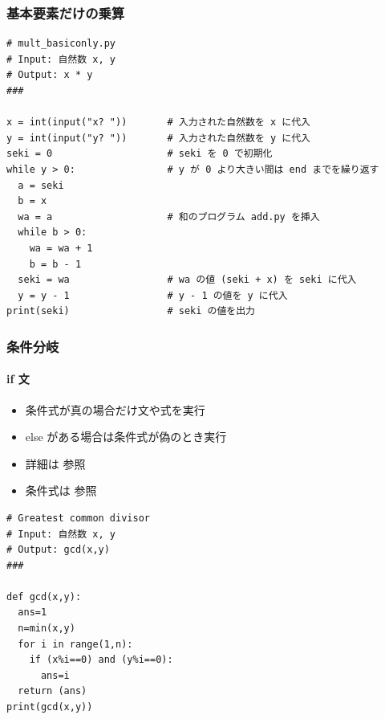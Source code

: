 \begin{frame}[fragile,label=mult,shrink]
\frametitle{基本要素だけの乗算}
  \begin{lstlisting}[caption={mult\_basiconly.py},label=lst:mult]
# mult_basiconly.py
# Input: 自然数 x, y
# Output: x * y
###

x = int(input("x? "))       # 入力された自然数を x に代入
y = int(input("y? "))       # 入力された自然数を y に代入
seki = 0                    # seki を 0 で初期化
while y > 0:                # y が 0 より大きい間は end までを繰り返す
  a = seki
  b = x
  wa = a                    # 和のプログラム add.py を挿入
  while b > 0:
    wa = wa + 1
    b = b - 1
  seki = wa                 # wa の値 (seki + x) を seki に代入
  y = y - 1                 # y - 1 の値を y に代入
print(seki)                 # seki の値を出力
  \end{lstlisting}
\end{frame}
\begin{frame}[fragile,label=if]
\frametitle{条件分岐}
\framesubtitle{if 文}
  \begin{itemize}
\item 条件式が真の場合だけ文や式を実行
\item else がある場合は条件式が偽のとき実行
\item 詳細は \href{https://docs.python.org/ja/3/reference/index.html}{}参照
\item 条件式は \href{https://docs.python.org/ja/3/reference/index.html}{}参照
  \end{itemize}
  \begin{lstlisting}[caption={gcd.py(if 文と for 文の例)},label=gcd]
# Greatest common divisor
# Input: 自然数 x, y
# Output: gcd(x,y)
###

def gcd(x,y):
  ans=1
  n=min(x,y)
  for i in range(1,n):
    if (x%i==0) and (y%i==0):
      ans=i
  return (ans)
print(gcd(x,y))
  \end{lstlisting}
\end{frame}
